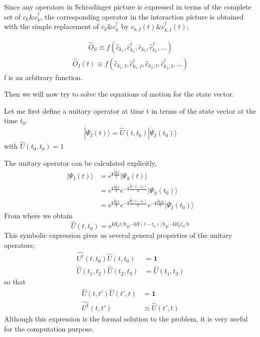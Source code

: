  Since any operators in Schrodinger picture is expressed in terms of the complete set of $c_k \& c^{\dagger}_k$, the corresponding operator in the interaction picture is obtained with the simple replacement of $c_k \& c^{\dagger}_k$ by $c_{k,I}(t) \& c^{\dagger}_{k,I}(t)$;

\begin{align}
\hat O_S \equiv f(\hat c_{k_1},\hat c^{\dagger}_{k_1},\hat c_{k_2},\hat c^{\dagger}_{k_2},...)\nonumber
\end{align}
\begin{align}
\hat O_I(t) \equiv f(\hat c_{k_1,I},\hat c^{\dagger}_{k_1,I},\hat c_{k_2,I},\hat c^{\dagger}_{k_2,I},...)\nonumber
\end{align}
f is an arbitrary function.

 Then we will now try to solve the equations of motion for the state vector.

 Let me first define a unitary operator at time t in terms of the state vector at the time $t_0$.
\begin{align}
|\Psi_I(t)\rangle=\hat U(t,t_0)|\Psi_I(t_0)\rangle
\end{align}
with $\hat U(t_0,t_0)=1$

 The unitary operator can be calculated explicitly,
\begin{align}
|\Psi_I(t)\rangle& =e^{\bm{i}  \frac{\hat H_0t}{\hbar}}|\Psi_S(t)\rangle \nonumber \\
&= e^{\bm{i}  \frac{\hat H_0t}{\hbar}}e^{-\bm{i}  \frac{\hat H(t-t_0)}{\hbar}}|\Psi_S(t_0)\rangle \nonumber \\& = e^{\bm{i}  \frac{\hat H_0t}{\hbar}}e^{-\bm{i}  \frac{\hat H(t-t_0)}{\hbar}}e^{-\bm{i}  \frac{\hat H_0t_0}{\hbar}}|\Psi_I(t_0)\rangle \nonumber
\end{align}
From where we obtain
\begin{equation} \tag{2.1.6'}
\hat{U}(t,t_0)=e^{\bm{i}H_0t/\hbar}e^{-\bm{i}H(t-t_0)/\hbar}e^{-\bm{i}H_0t_0/\hbar} \nonumber
\end{equation}
 This symbolic expression gives us several general properties of the unitary operators;
\begin{align}
\hat{U^{\dagger}}(t,t_0)\hat{U}(t,t_0)&=\bm{1} \nonumber\\
\hat{U}(t_1,t_2)\hat{U}(t_2,t_3)&=\hat{U}(t_1,t_3)\nonumber
\end{align}
so that 
\begin{align}
\hat{U}(t,t')\hat{U}(t',t)&=\bm{1} \nonumber \\
\hat{U^{\dagger}}(t,t') & \equiv \hat{U}(t',t) \nonumber
\end{align}
 Although this expression is the formal solution to the problem, it is very useful for the computation purpose.


